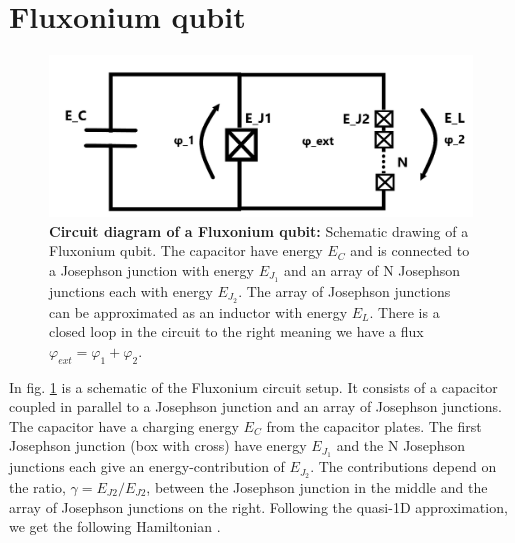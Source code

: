 \section{Fluxonium qubit}
    \begin{figure}
        \centering
        \includegraphics[width = 13cm]{Images/Fluxonium.png}
        \caption[Circuit diagram of a Fluxonium qubit]{\textbf{Circuit diagram of a Fluxonium qubit:} Schematic drawing of a Fluxonium qubit. The capacitor have energy $E_C$ and is connected to a Josephson junction with energy $E_{J_{1}}$ and an array of N Josephson junctions each with energy $E_{J_{2}}$. The array of Josephson junctions can be approximated as an inductor with energy $E_L$. There is a closed loop in the circuit to the right meaning we have a flux $\varphi_{ext} = \varphi_1 + \varphi_2$.}
        \label{fig:Fluxonium}
    \end{figure}
    In fig. \ref{fig:Fluxonium} is a schematic of the Fluxonium circuit setup. It consists of a capacitor coupled in parallel to a Josephson junction and an array of Josephson junctions. The capacitor have a charging energy $E_C$ from the capacitor plates. The first Josephson junction (box with cross) have energy $E_{J_{1}}$ and the N Josephson junctions each give an energy-contribution of $E_{J_{2}}$. The contributions depend on the ratio,  $\gamma = E_{J2}/E_{J2}$, between the Josephson junction in the middle and the array of Josephson junctions on the right. Following the quasi-1D approximation, we get the following Hamiltonian \cite{Krantz2019}.
